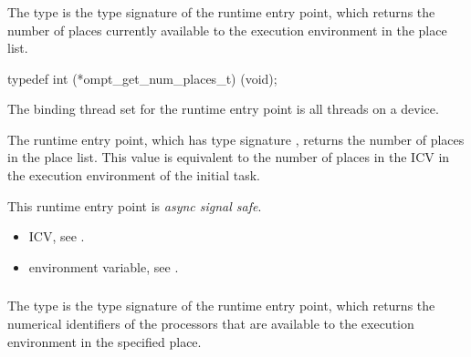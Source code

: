 \subsubsection{}
\label{sec:ompt_get_num_places_t}
\label{sec:ompt_get_num_places}

\summary
The  type is the type signature of the 
 runtime entry point, which returns the
number of places currently available to the execution environment 
in the place list.

\format
\begin{ccppspecific}
\begin{omptInquiry}
typedef int (*ompt_get_num_places_t) (void);
\end{omptInquiry}
\end{ccppspecific}

\binding
The binding thread set for the  runtime entry 
point is all threads on a device.

\descr
The  runtime entry point, which has type signature 
, returns the number of places in the place list. 
This value is equivalent to the number of places in the  
ICV in the execution environment of the initial task.

This runtime entry point is \emph{async signal safe}.

\crossreferences
\begin{itemize}
\item {} ICV, see
.

\item {} environment variable, see
.
\end{itemize}




\subsubsection{}
\label{sec:ompt_get_place_proc_ids_t}
\label{sec:ompt_get_place_proc_ids}

\summary
The  type is the type signature of the 
 runtime entry point, which returns the
numerical identifiers of the processors that are available to the execution 
environment in the specified place.


